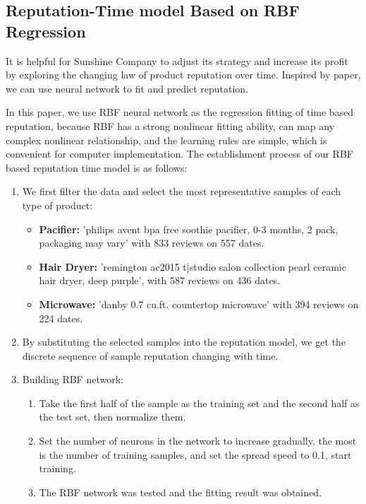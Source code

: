 \documentclass{mcmthesis}
\begin{document}
\subsection{Reputation-Time model Based on RBF Regression}
It is helpful for Sunshine Company to adjust its strategy and increase its profit by exploring the changing law of product reputation over time. Inspired by paper\cite{tang2015user}, we can use neural network to fit and predict reputation.

In this paper, we use RBF neural network as the regression fitting of time based reputation, because RBF has a strong nonlinear fitting ability, can map any complex nonlinear relationship, and the learning rules are simple, which is convenient for computer implementation. The establishment process of our RBF based reputation time model is as follows:
\begin{enumerate}
	\item We first filter the data and select the most representative samples of each type of product:
	\begin{itemize}
		\item \textbf{Pacifier: }'philips avent bpa free soothie pacifier, 0-3 months, 2 pack, packaging may vary' with 833 reviews on 557 dates.
		\item \textbf{Hair Dryer: }'remington ac2015 t|studio salon collection pearl ceramic hair dryer, deep purple', with 587 reviews on 436 dates.
		\item \textbf{Microwave: }'danby 0.7 cu.ft. countertop microwave' with 394 reviews on 224 dates.
	\end{itemize}
	\item By substituting the selected samples into the reputation model, we get the discrete sequence of sample reputation changing with time.
	\item Building RBF network:
	\begin{enumerate}
		\item Take the first half of the sample as the training set and the second half as the test set, then normalize them.
		\item Set the number of neurons in the network to increase gradually, the most is the number of training samples, and set the spread speed to 0.1, start training.
		\item The RBF network was tested and the fitting result was obtained.
	\end{enumerate}
\end{enumerate}
\end{document}
